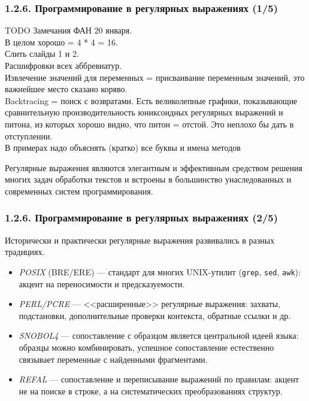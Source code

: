 \documentclass[mathserif,12pt,aspectratio=169]{beamer}
\renewcommand{\index}[1]{}
\def\odmkey#1#2{{\it\color{red} #1}\index{#2}}
\def\TODO#1{{\color{gray} TODO {#1}}}
\begin{document}
\begin{frame}
\frametitle{1.2.6. Программирование в регулярных выражениях (1/5)}
\TODO{ Замечания ФАН 20 января. \\
В целом хорошо = 4 * 4 = 16. \\
Слить слайды 1 и 2.\\
Расшифровки всех аббревиатур. \\
Извлечение значений для переменных = присваивание переменным значений, это важнейшее место сказано коряво. \\
Backtracing = поиск с возвратами. Есть великолепные графики, показывающие сравнительную производительность юниксоидных регулярных выражений и питона, из которых хорошо видно, что питон = отстой. Это неплохо бы дать в отступлении. \\
В примерах надо объяснять (кратко) все буквы и имена методов}




Регулярные выражения являются элегантным и эффективным средством
решения многих задач обработки текстов и встроены в большинство
унаследованных и современных систем программирования.
\end{frame}


\begin{frame}
\frametitle{1.2.6. Программирование в регулярных выражениях (2/5)}
Исторически и практически регулярные выражения развивались в разных традициях.

\smallskip
\begin{itemize}
\item \odmkey{POSIX}{POSIX} (BRE/ERE) --- стандарт для многих UNIX-утилит
(\texttt{grep}, \texttt{sed}, \texttt{awk}):
акцент на переносимости и предсказуемости.

\smallskip
\item \odmkey{PERL/PCRE}{PERL@PERL/PCRE} --- <<расширенные>> регулярные выражения: захваты, подстановки, дополнительные проверки контекста, обратные ссылки и др.

\smallskip
\item \odmkey{SNOBOL4}{SNOBOL4} --- сопоставление с образцом является центральной
идеей языка: образцы можно комбинировать, успешное сопоставление
естественно связывает переменные с найденными фрагментами.

\smallskip
\item \odmkey{REFAL}{REFAL} --- сопоставление и переписывание выражений по правилам: акцент не на поиске в строке, а на систематических преобразованиях структур.
\end{itemize}
\end{frame}
\end{document}
